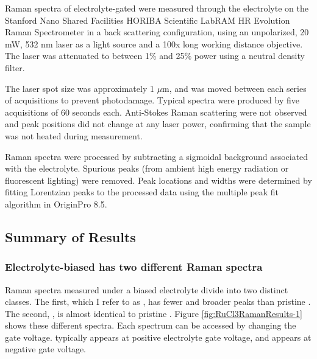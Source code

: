Raman spectra of electrolyte-gated \rucl were measured through the electrolyte on the Stanford Nano Shared Facilities HORIBA Scientific LabRAM HR Evolution Raman Spectrometer in a back scattering configuration, using an unpolarized, 20 mW, 532 nm laser as a light source and a 100x long working distance objective. The laser was attenuated to between 1\% and 25\% power using a neutral density filter.

The laser spot size was approximately 1 $\mu$m, and was moved between each series of acquisitions to prevent photodamage. Typical spectra were produced by five acquisitions of 60 seconds each. Anti-Stokes Raman scattering were not observed and peak positions did not change at any laser power, confirming that the sample was not heated during measurement.

Raman spectra were processed by subtracting a sigmoidal background associated with the electrolyte. Spurious peaks (from ambient high energy radiation or fluorescent lighting) were removed. Peak locations and widths were determined by fitting Lorentzian peaks to the processed data using the multiple peak fit algorithm in OriginPro 8.5.

\subsection{Summary of Results}

\subsubsection{Electrolyte-biased \rucl has two different Raman spectra}

Raman spectra \rucl measured under a biased electrolyte divide into two distinct classes. The first, which I refer to as \pone , has fewer and broader peaks than pristine \ruclnospace. The second, \pzero , is almost identical to pristine \ruclnospace. Figure \ref{fig:RuCl3RamanResults-1} shows these different spectra. Each spectrum can be accessed by changing the gate voltage. \pone{} typically appears at positive electrolyte gate voltage, and \pzero{} appears at negative gate voltage.


